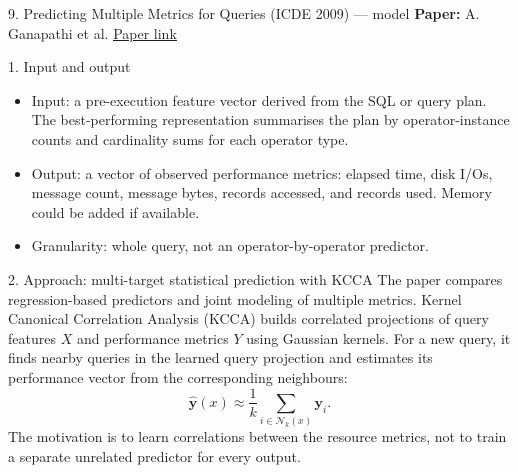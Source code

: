 \documentclass[aspectratio=169,10pt]{beamer}
\newcommand{\paperlink}[2]{\href{#1}{\textcolor{WayangTeal}{\underline{#2}}}}
\begin{document}
\begin{frame}[shrink=10]{9. Predicting Multiple Metrics for Queries (ICDE 2009) — model}
\small
\textbf{Paper:} A. Ganapathi et al.
\hfill\paperlink{https://doi.org/10.1109/ICDE.2009.130}{Paper link}

\begin{block}{1. Input and output}
\begin{itemize}\setlength\itemsep{1pt}
  \item Input: a pre-execution feature vector derived from the SQL or query plan. The best-performing representation summarises the plan by operator-instance counts and cardinality sums for each operator type.
  \item Output: a vector of observed performance metrics: elapsed time, disk I/Os, message count, message bytes, records accessed, and records used. Memory could be added if available.
  \item Granularity: whole query, not an operator-by-operator predictor.
\end{itemize}
\end{block}

\begin{block}{2. Approach: multi-target statistical prediction with KCCA}
The paper compares regression-based predictors and joint modeling of multiple metrics. Kernel Canonical Correlation Analysis (KCCA) builds correlated projections of query features $X$ and performance metrics $Y$ using Gaussian kernels. For a new query, it finds nearby queries in the learned query projection and estimates its performance vector from the corresponding neighbours:
\[
  \widehat{\mathbf y}(x)\approx\frac{1}{k}\sum_{i\in\mathcal N_k(x)}\mathbf y_i.
\]
The motivation is to learn correlations between the resource metrics, not to train a separate unrelated predictor for every output.
\end{block}
\end{frame}
\end{document}

